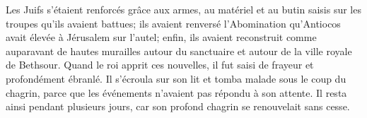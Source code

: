 Les Juifs s’étaient renforcés grâce aux armes, au matériel et au butin
	saisis sur les troupes qu’ils avaient battues;
	ils avaient renversé l’Abomination qu’Antiocos avait élevée à Jérusalem sur l’autel;
	enfin, ils avaient reconstruit comme auparavant
		de hautes murailles autour du sanctuaire
	et autour de la ville royale de Bethsour.
Quand le roi apprit ces nouvelles, il fut saisi de frayeur et profondément ébranlé.
	Il s’écroula sur son lit et tomba malade sous le coup du chagrin,
	parce que les événements n’avaient pas répondu à son attente.
Il resta ainsi pendant plusieurs jours,
	car son profond chagrin se renouvelait sans cesse.
